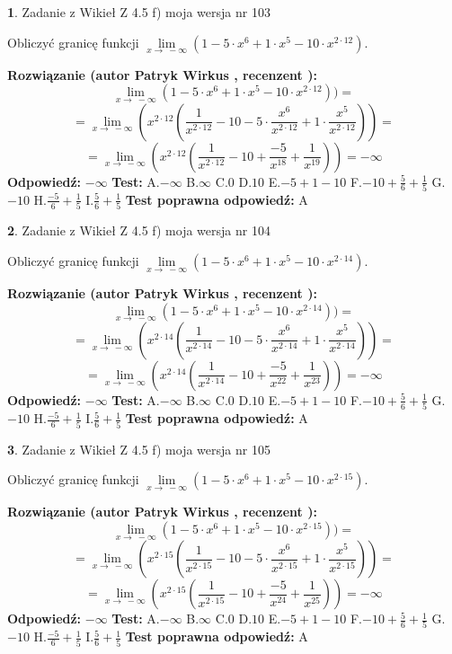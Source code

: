 \documentclass[12pt, a4paper]{article}
\theoremstyle{definition} %
\newtheorem{zad}{}
\newcommand{\zadStart}[1]{\begin{zad}#1\newline}
\newcommand{\zadStop}{\end{zad}}
\newcommand{\rozwStart}[2]{\noindent \textbf{Rozwiązanie (autor #1 , recenzent #2): }\newline}
\newcommand{\rozwStop}{\newline}
\newcommand{\odpStart}{\noindent \textbf{Odpowiedź:}\newline}
\newcommand{\odpStop}{\newline}
\newcommand{\testStart}{\noindent \textbf{Test:}\newline}
\newcommand{\testStop}{\newline}
\newcommand{\kluczStart}{\noindent \textbf{Test poprawna odpowiedź:}\newline}
\newcommand{\kluczStop}{\newline}
\begin{document}
\zadStart{Zadanie z Wikieł Z 4.5 f) moja wersja nr 103}



Obliczyć granicę funkcji  $\lim\limits_{x\to\ -\infty}(1 - 5 \cdot x^{6}+1 \cdot x^{5}- 10 \cdot x^{2\cdot12})$.
\zadStop
\rozwStart{Patryk Wirkus}{}
$$\lim\limits_{x\to\ -\infty}(1 - 5 \cdot x^{6}+1 \cdot x^{5}- 10 \cdot x^{2\cdot12}))=$$
$$=\lim\limits_{x\to\ -\infty}(x^{2\cdot12}(\frac{1}{x^{2\cdot12}}-10 -5 \cdot \frac{x^{6}}{x^{2\cdot12}}+1 \cdot \frac{x^{5}}{x^{2\cdot12}}))=$$
$$=\lim\limits_{x\to\ -\infty}(x^{2\cdot12}(\frac{1}{x^{2\cdot12}}-10 + \frac{-5}{x^{18}}+ \frac{1}{x^{19}}))=-\infty$$
\rozwStop
\odpStart
$-\infty$
\odpStop
\testStart
A.$-\infty$ B.$\infty$ C.$0$ D.$10$ E.$-5 + 1 - 10$
F.$-10+\frac{5}{6}+\frac{1}{5}$ G.$-10$
H.$\frac{-5}{6}+\frac{1}{5}$
I.$\frac{5}{6}+\frac{1}{5}$
\testStop
\kluczStart
A
\kluczStop



\zadStart{Zadanie z Wikieł Z 4.5 f) moja wersja nr 104}



Obliczyć granicę funkcji  $\lim\limits_{x\to\ -\infty}(1 - 5 \cdot x^{6}+1 \cdot x^{5}- 10 \cdot x^{2\cdot14})$.
\zadStop
\rozwStart{Patryk Wirkus}{}
$$\lim\limits_{x\to\ -\infty}(1 - 5 \cdot x^{6}+1 \cdot x^{5}- 10 \cdot x^{2\cdot14}))=$$
$$=\lim\limits_{x\to\ -\infty}(x^{2\cdot14}(\frac{1}{x^{2\cdot14}}-10 -5 \cdot \frac{x^{6}}{x^{2\cdot14}}+1 \cdot \frac{x^{5}}{x^{2\cdot14}}))=$$
$$=\lim\limits_{x\to\ -\infty}(x^{2\cdot14}(\frac{1}{x^{2\cdot14}}-10 + \frac{-5}{x^{22}}+ \frac{1}{x^{23}}))=-\infty$$
\rozwStop
\odpStart
$-\infty$
\odpStop
\testStart
A.$-\infty$ B.$\infty$ C.$0$ D.$10$ E.$-5 + 1 - 10$
F.$-10+\frac{5}{6}+\frac{1}{5}$ G.$-10$
H.$\frac{-5}{6}+\frac{1}{5}$
I.$\frac{5}{6}+\frac{1}{5}$
\testStop
\kluczStart
A
\kluczStop



\zadStart{Zadanie z Wikieł Z 4.5 f) moja wersja nr 105}



Obliczyć granicę funkcji  $\lim\limits_{x\to\ -\infty}(1 - 5 \cdot x^{6}+1 \cdot x^{5}- 10 \cdot x^{2\cdot15})$.
\zadStop
\rozwStart{Patryk Wirkus}{}
$$\lim\limits_{x\to\ -\infty}(1 - 5 \cdot x^{6}+1 \cdot x^{5}- 10 \cdot x^{2\cdot15}))=$$
$$=\lim\limits_{x\to\ -\infty}(x^{2\cdot15}(\frac{1}{x^{2\cdot15}}-10 -5 \cdot \frac{x^{6}}{x^{2\cdot15}}+1 \cdot \frac{x^{5}}{x^{2\cdot15}}))=$$
$$=\lim\limits_{x\to\ -\infty}(x^{2\cdot15}(\frac{1}{x^{2\cdot15}}-10 + \frac{-5}{x^{24}}+ \frac{1}{x^{25}}))=-\infty$$
\rozwStop
\odpStart
$-\infty$
\odpStop
\testStart
A.$-\infty$ B.$\infty$ C.$0$ D.$10$ E.$-5 + 1 - 10$
F.$-10+\frac{5}{6}+\frac{1}{5}$ G.$-10$
H.$\frac{-5}{6}+\frac{1}{5}$
I.$\frac{5}{6}+\frac{1}{5}$
\testStop
\kluczStart
A
\kluczStop
\end{document}
